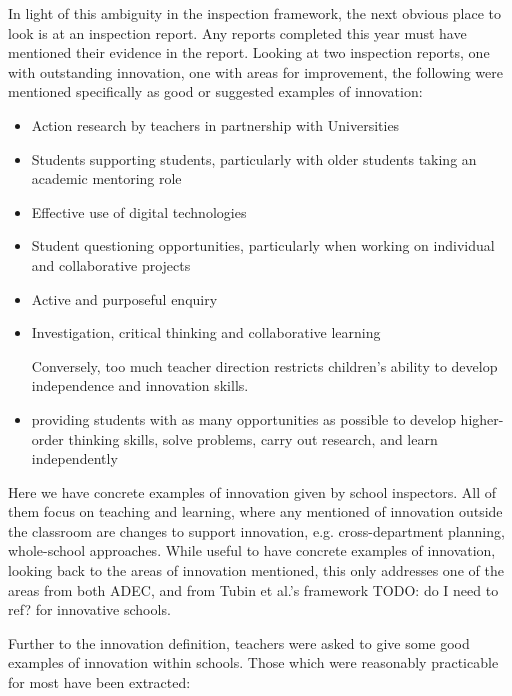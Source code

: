 In light of this ambiguity in the inspection framework, the next obvious place to look is at an inspection report. Any reports completed this year must have mentioned their evidence in the report. Looking at two inspection reports, one with outstanding innovation, one with areas for improvement, the following were mentioned specifically as good or suggested examples of innovation:
\begin{itemize}
\item Action research by teachers in partnership with Universities
\item Students supporting students, particularly with older students taking an academic mentoring role
\item Effective use of digital technologies
\item Student questioning opportunities, particularly when working on individual and collaborative projects
\item Active and purposeful enquiry 
\item Investigation, critical thinking and collaborative learning
\item [Conversely,] too much teacher direction restricts children’s ability to develop independence and innovation skills.
\item providing students with as many opportunities as possible to develop higher-order thinking skills, solve problems, carry out research, and learn independently
\end{itemize}

Here we have concrete examples of innovation given by school inspectors. All of them focus on teaching and learning, where any mentioned of innovation outside the classroom are changes to support innovation, e.g. cross-department planning, whole-school approaches. While useful to have concrete examples of innovation, looking back to the areas of innovation mentioned, this only addresses one of the areas from both ADEC, and from Tubin et al.'s framework TODO: do I need to ref? for innovative schools.

Further to the innovation definition, teachers were asked to give some good examples of innovation within schools. Those which were reasonably practicable for most have been extracted: 

